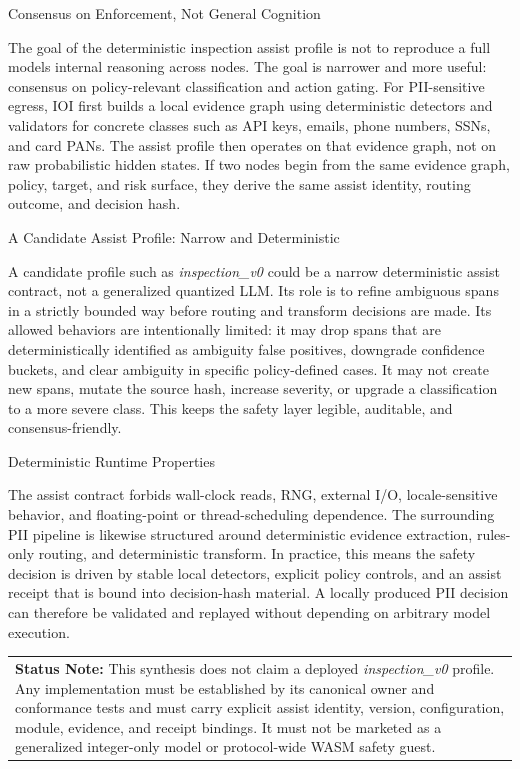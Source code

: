 \documentclass[
  11pt,
]{article}
\begin{document}
Consensus on Enforcement, Not General Cognition

The goal of the deterministic inspection assist profile is not to
reproduce a full model\textquotesingle s internal reasoning across
nodes. The goal is narrower and more useful: consensus on
policy-relevant classification and action gating. For
PII-sensitive egress, IOI first builds a local evidence graph using
deterministic detectors and validators for concrete classes such as API
keys, emails, phone numbers, SSNs, and card PANs. The assist profile
then operates on that evidence graph, not on raw probabilistic hidden
states. If two
nodes begin from the same evidence graph, policy, target, and risk
surface, they derive the same assist identity, routing outcome, and
decision hash.

A Candidate Assist Profile: Narrow and Deterministic

A candidate profile such as \emph{inspection\_v0} could be a narrow
deterministic assist contract, not a generalized quantized LLM. Its role is to refine
ambiguous spans in a strictly bounded way before routing and transform
decisions are made. Its allowed behaviors are intentionally limited: it
may drop spans that are deterministically identified as ambiguity false
positives, downgrade confidence buckets, and clear ambiguity in specific
policy-defined cases. It may not create new spans, mutate the source
hash, increase severity, or upgrade a classification to a more severe
class. This keeps the safety layer legible, auditable, and
consensus-friendly.

Deterministic Runtime Properties

The assist contract forbids wall-clock reads, RNG, external I/O,
locale-sensitive behavior, and floating-point or thread-scheduling
dependence. The surrounding PII pipeline is likewise structured around
deterministic evidence extraction, rules-only routing, and deterministic
transform. In practice, this means the safety decision is driven by
stable local detectors, explicit policy controls, and an assist receipt
that is bound into decision-hash material. A locally produced PII
decision can therefore be validated and replayed without depending on
arbitrary model execution.

\begin{longtable}[]{@{}>{\raggedright\arraybackslash}p{\linewidth}@{}}
\toprule\noalign{}
 \\
\midrule\noalign{}
\endhead
\bottomrule\noalign{}
\endlastfoot
\textbf{Status Note: }This synthesis does not claim a deployed
\emph{inspection\_v0} profile. Any implementation must be established by its
canonical owner and conformance tests and must carry explicit assist identity,
version, configuration, module, evidence, and receipt bindings. It must not be
marketed as a generalized integer-only model or protocol-wide WASM safety guest. \\
\end{longtable}
\end{document}

